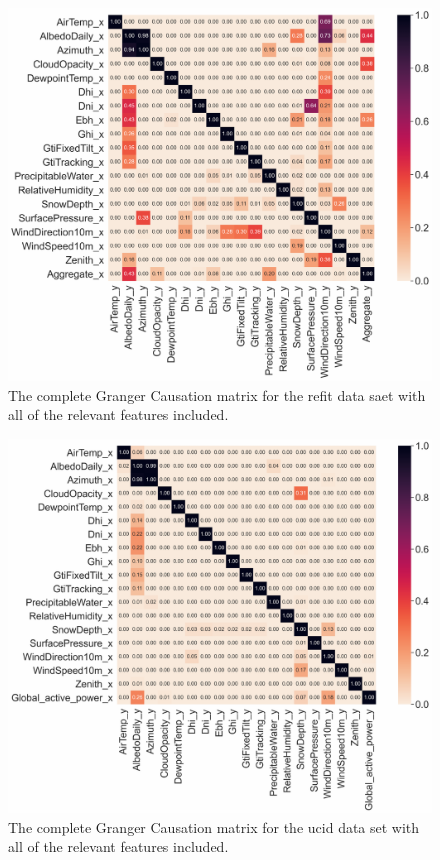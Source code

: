 \begin{figure}[hbt!]
    \centering
    \includegraphics[width=\textwidth]{Images/Chapter 4/REFIT/REFIT-House-12-Grangers-Causality-Matrix.pdf}
    \caption{The complete Granger Causation matrix for the \gls{refit} data saet with all of the relevant features included.}
    \label{fig:REFIT-House-12-Grangers-Causality-Matrix-All}
\end{figure}

\begin{figure}[hbt!]
    \centering
    \includegraphics[width=\textwidth]{Images/Chapter 4/UCID/UCID-Grangers-Causality-Matrix.pdf}
    \caption{The complete Granger Causation matrix for the \gls{ucid} data set with all of the relevant features included.}
    \label{fig:UCID-Grangers-Causality-Matrix-All}
\end{figure}

